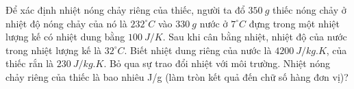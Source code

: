\begin{vidu}
	Để xác định nhiệt nóng chảy riêng của thiếc, người ta đổ $350\ g$ thiếc nóng chảy ở nhiệt độ nóng chảy của nó là $232^\circ C$ vào $330\ g$ nước ở $7^\circ C$ đựng trong một nhiệt lượng kế có nhiệt dung bằng $100\ J / K$. Sau khi cân bằng nhiệt, nhiệt độ của nước trong nhiệt lượng kế là $32^\circ C$. Biết nhiệt dung riêng của nước là $4200\ J /kg.K$, của thiếc rắn là $230\ J /kg.K$. Bỏ qua sự trao đổi nhiệt với môi trường. Nhiệt nóng chảy riêng của thiếc là bao nhiêu J/g (làm tròn kết quả đến chữ số hàng đơn vị)?
	\end{vidu}

